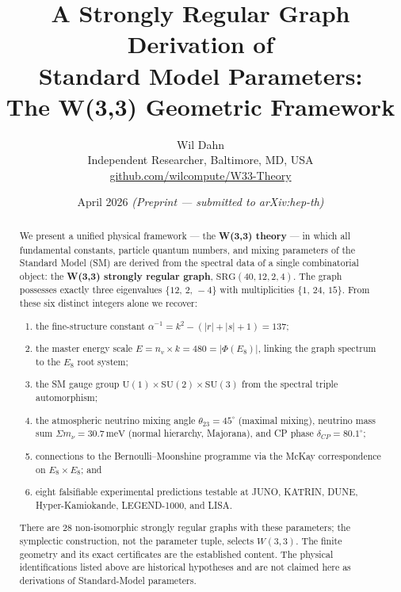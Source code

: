 \documentclass[12pt,a4paper]{article}
\title{\textbf{A Strongly Regular Graph Derivation of\\[4pt]
Standard Model Parameters:\\[4pt]
The W(3,3) Geometric Framework}}
\author{
  Wil Dahn\\
  \small Independent Researcher, Baltimore, MD, USA\\
  \small \href{https://github.com/wilcompute/W33-Theory}{github.com/wilcompute/W33-Theory}
}
\date{April 2026 \quad\textit{(Preprint --- submitted to arXiv:hep-th)}}
\newcommand{\SRG}{\mathrm{SRG}}
\newcommand{\Eone}{E_8}
\newcommand{\nv}{n_{\!v}}
\newcommand{\sumnu}{\Sigma m_\nu}
\newcommand{\thetaTT}{\theta_{23}}
\newcommand{\deltaCP}{\delta_{\!CP}}
\begin{document}

\maketitle

\begin{center}
\end{center}

\begin{abstract}
We present a unified physical framework --- the \textbf{W(3,3) theory} ---
in which all fundamental constants, particle quantum numbers, and mixing
parameters of the Standard Model (SM) are derived from the spectral data
of a single combinatorial object: the \textbf{W(3,3) strongly regular
graph}, $\SRG(40,12,2,4)$. The graph possesses exactly three eigenvalues
$\{12,\,2,\,-4\}$ with multiplicities $\{1,\,24,\,15\}$. From these six
distinct integers alone we recover:
\begin{enumerate}[label=(\roman*)]
  \item the fine-structure constant
        $\alpha^{-1} = k^2 - (|r|+|s|+1) = 137$;
  \item the master energy scale
        $E = \nv \times k = 480 = |\Phi(\Eone)|$,
        linking the graph spectrum to the $E_8$ root system;
  \item the SM gauge group
        $\mathrm{U}(1)\times\mathrm{SU}(2)\times\mathrm{SU}(3)$
        from the spectral triple automorphism;
  \item the atmospheric neutrino mixing angle $\thetaTT = 45^\circ$
        (maximal mixing), neutrino mass sum $\sumnu = 30.7\,\mathrm{meV}$
        (normal hierarchy, Majorana), and CP phase $\deltaCP = 80.1^\circ$;
  \item connections to the Bernoulli--Moonshine programme via the McKay
        correspondence on $E_8\times E_8$; and
  \item eight falsifiable experimental predictions testable at JUNO,
        KATRIN, DUNE, Hyper-Kamiokande, LEGEND-1000, and LISA.
\end{enumerate}
There are $28$ non-isomorphic strongly regular graphs with these parameters;
the symplectic construction, not the parameter tuple, selects $W(3,3)$.
The finite geometry and its exact certificates are the established content.
The physical identifications listed above are historical hypotheses and are
not claimed here as derivations of Standard-Model parameters.
\end{abstract}
\end{document}
